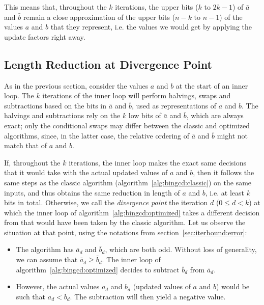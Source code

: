 \documentclass{llncs}
\begin{document}
This means that, throughout the $k$ iterations, the upper bits ($k$ to
$2k-1$) of $\bar a$ and $\bar b$ remain a close approximation of the
upper bits ($n-k$ to $n-1$) of the values $a$ and $b$ that they
represent, i.e. the values we would get by applying the update factors
right away.

\subsection{Length Reduction at Divergence Point}\label{sec:iterbound:diverge}

As in the previous section, consider the values $a$ and $b$ at the start
of an inner loop. The $k$ iterations of the inner loop will perform
halvings, swaps and subtractions based on the bits in $\bar a$ and $\bar
b$, used as representations of $a$ and $b$. The halvings and
subtractions rely on the $k$ low bits of $\bar a$ and $\bar b$, which
are always exact; only the conditional swaps may differ between the
classic and optimized algorithms, since, in the latter case, the
relative ordering of $\bar a$ and $\bar b$ might not match that of $a$
and $b$.

If, throughout the $k$ iterations, the inner loop makes the exact same
decisions that it would take with the actual updated values of $a$ and
$b$, then it follows the same steps as the classic algorithm
(algorithm~\ref{alg:bingcd:classic}) on the same inputs, and thus
obtains the same reduction in length of $a$ and $b$, i.e. at least $k$
bits in total. Otherwise, we call the \emph{divergence point} the
iteration $d$ ($0\leq d < k$) at which the inner loop of
algorithm~\ref{alg:bingcd:optimized} takes a different decision from
that would have been taken by the classic algorithm. Let us observe the
situation at that point, using the notations from
section~\ref{sec:iterbound:error}:

\begin{itemize}

    \item The algorithm has $\bar a_d$ and $\bar b_d$, which are both odd.
    Without loss of generality, we can assume that $\bar a_d \geq \bar b_d$.
    The inner loop of algorithm~\ref{alg:bingcd:optimized} decides to
    subtract $\bar b_d$ from $\bar a_d$.

    \item However, the actual values $a_d$ and $b_d$ (updated values of
    $a$ and $b$) would be such that $a_d < b_d$. The subtraction will
    then yield a negative value.

\end{itemize}
\end{document}
